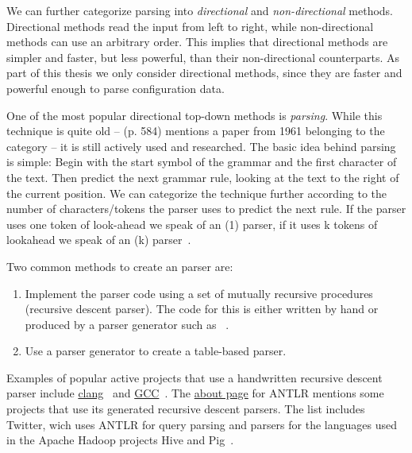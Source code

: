 We can further categorize parsing into \emph{directional} and \emph{non-directional} methods. Directional methods read the input from left to right, while non-directional methods can use an arbitrary order. This implies that directional methods are simpler and faster, but less powerful, than their non-directional counterparts. As part of this thesis we only consider directional methods, since they are faster and powerful enough to parse configuration data.

One of the most popular directional top-down methods is \emph{ parsing}. While this technique is quite old –  (p. 584) mentions a paper from 1961 belonging to the  category – it is still actively used and researched. The basic idea behind  parsing is simple: Begin with the start symbol of the grammar and the first character of the text. Then predict the next grammar rule, looking at the text to the right of the current position. We can categorize the technique further according to the number of characters/tokens the parser uses to predict the next rule. If the parser uses one token of look-ahead we speak of an (1) parser, if it uses k tokens of lookahead we speak of an (k) parser~\cite{rosenkrantz1969properties}.

Two common methods to create an  parser are:

\begin{enumerate}

  \item Implement the parser code using a set of mutually recursive procedures (recursive descent parser). The code for this is either written by hand or produced by a parser generator such as ~\cite{parr2013recursive}.

  \item Use a parser generator to create a table-based parser.

\end{enumerate}

Examples of popular active projects that use a handwritten recursive descent parser include \href{http://clang.llvm.org}{clang}~\cite{bendersky2012clang} and \href{http://gcc.gnu.org}{GCC}~\cite{myers2008cparser}. The \href{http://www.antlr.org/about.html}{about page} for \gls{ANTLR} mentions some projects that use its generated recursive descent parsers. The list includes Twitter, wich uses ANTLR for query parsing and parsers for the languages used in the Apache Hadoop projects Hive and Pig~\cite{parr2013definitive}.


